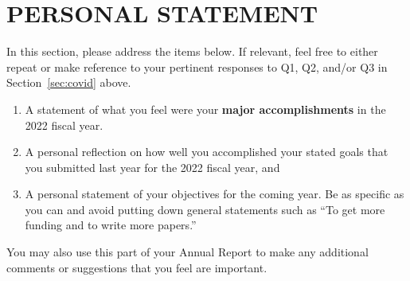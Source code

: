 \documentclass[11pt]{article}
\newcommand{\fy}{2022}
\begin{document}
\newpage
\section{PERSONAL STATEMENT}

In this section, please address the items below. If relevant, feel free
to either repeat or make reference to your pertinent responses to Q1,
Q2, and/or Q3 in Section~\ref{sec:covid} above.

\begin{enumerate}
\item
  A statement of what you feel were your \textbf{major accomplishments}
  in the \fy{} fiscal year.
\item
  A personal reflection on how well you accomplished your stated goals
  that you submitted last year for the \fy{} fiscal year, and
\item
  A personal statement of your objectives for the coming year. Be as
  specific as you can and avoid putting down general statements such as
  ``To get more funding and to write more papers.''
\end{enumerate}

You may also use this part of your Annual Report to make any additional
comments or suggestions that you feel are important.
\end{document}
